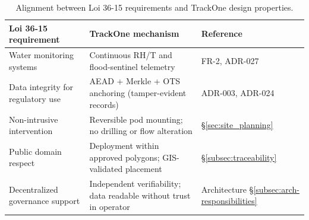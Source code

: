 \begin{table}[H]
\centering
\small
\caption{Alignment between Loi 36-15 requirements and TrackOne design properties.}
\label{tab:law-36-15-alignment}
\begin{tabular}{@{}p{4.2cm}p{5.0cm}p{4.2cm}@{}}
\toprule
\textbf{Loi 36-15 requirement}     & \textbf{TrackOne mechanism}                           & \textbf{Reference} \\
\midrule
Water monitoring systems            & Continuous RH/T and flood-sentinel telemetry           & FR-2, \ac{ADR}-027                                \\
Data integrity for regulatory use   & \ac{AEAD} + Merkle + \ac{OTS} anchoring (tamper-evident records) & \ac{ADR}-003, \ac{ADR}-024 \\
Non-intrusive intervention          & Reversible pod mounting; no drilling or flow alteration & \S\ref{sec:site_planning} \\
Public domain respect               & Deployment within approved polygons; \ac{GIS}-validated placement & \S\ref{subsec:traceability} \\
Decentralized governance support    & Independent verifiability; data readable without trust in operator & Architecture \S\ref{subsec:arch-responsibilities} \\
\bottomrule
\end{tabular}
\end{table}


